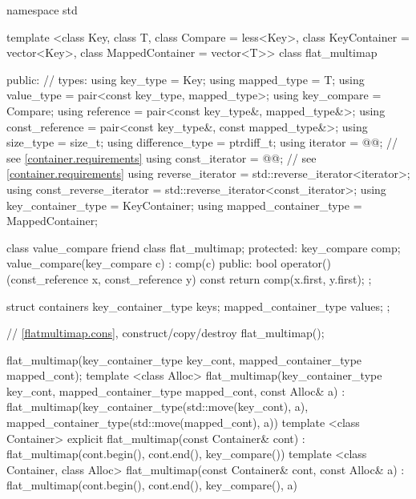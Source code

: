 \begin{codeblock}
\begin{codeblock}
\begin{codeblock}
\begin{addedblock}
\begin{codeblock}
namespace std {
  template <class Key, class T, class Compare = less<Key>,
            class KeyContainer = vector<Key>,
            class MappedContainer = vector<T>>
  class flat_multimap {
  public:
      // types:
      using key_type                  = Key;
      using mapped_type               = T;
      using value_type                = pair<const key_type, mapped_type>;
      using key_compare               = Compare;
      using reference                 = pair<const key_type&, mapped_type&>;
      using const_reference           = pair<const key_type&, const mapped_type&>;
      using size_type                 = size_t;
      using difference_type           = ptrdiff_t;
      using iterator                  = @@; // see \ref{container.requirements}
      using const_iterator            = @@; // see \ref{container.requirements}
      using reverse_iterator          = std::reverse_iterator<iterator>;
      using const_reverse_iterator    = std::reverse_iterator<const_iterator>;
      using key_container_type        = KeyContainer;
      using mapped_container_type     = MappedContainer;

      class value_compare {
        friend class flat_multimap;
      protected:
        key_compare comp;
        value_compare(key_compare c) : comp(c) { }
      public:
        bool operator()(const_reference x, const_reference y) const {
          return comp(x.first, y.first);
        }
      };

      struct containers
      {
        key_container_type keys;
        mapped_container_type values;
      };

      // \ref{flatmultimap.cons}, construct/copy/destroy
      flat_multimap();

      flat_multimap(key_container_type key_cont, mapped_container_type mapped_cont);
      template <class Alloc>
      flat_multimap(key_container_type key_cont, mapped_container_type mapped_cont,
                    const Alloc& a)
          : flat_multimap(key_container_type(std::move(key_cont), a),
                          mapped_container_type(std::move(mapped_cont), a))
        { }
      template <class Container>
        explicit flat_multimap(const Container& cont)
          : flat_multimap(cont.begin(), cont.end(), key_compare()) { }
      template <class Container, class Alloc>
        flat_multimap(const Container& cont, const Alloc& a)
          : flat_multimap(cont.begin(), cont.end(), key_compare(), a) { }

}}
\end{codeblock}
\end{addedblock}
\end{codeblock}
\end{codeblock}
\end{codeblock}
